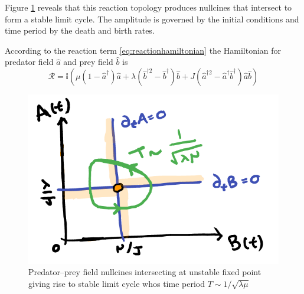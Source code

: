 \documentclass{article}[12pt]
\numberwithin{equation}{section}
\begin{document}
Figure \ref{fig:lotkavolterraspace} reveals that this reaction topology produces
nullcines that intersect to form a stable limit cycle. The amplitude is governed
by the initial conditions and time period by the death and birth rates.

According to the reaction term \eqref{eq:reactionhamiltonian} the
Hamiltonian for predator field $\hat a$ and prey field $\hat b$ is
\begin{equation}
	\mathcal{R}=\mathbb{i}
	\left(
		\mu (1-\hat a^\dagger)\hat a
		+ \lambda (\hat b^{\dagger2}-\hat b^\dagger)\hat b
		+ J (\hat a^{\dagger2}-\hat a^\dagger \hat b^\dagger) \hat a \hat b
	\right)
\end{equation}
\begin{figure}[H]
\centering{}
\captionsetup{justification=centering}
\includegraphics[scale=0.4]{figures/lotkavolterraspace}
\caption{Predator--prey field nullcines intersecting at unstable
fixed point\\ giving rise to stable limit cycle
whos time period $T\sim 1/\sqrt{\lambda\mu}$ }
\label{fig:lotkavolterraspace}
\end{figure}
\end{document}
